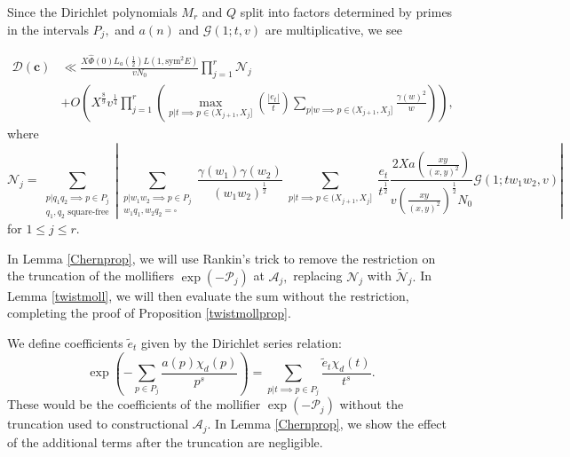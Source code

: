 \documentclass[12pt]{amsart}
\numberwithin{equation}{section}
\numberwithin{thm}{section}
\newcommand{\1}{\mathbf 1}
\begin{document}
Since the Dirichlet polynomials $M_r$ and $Q$ split into factors determined by primes in the intervals $P_j,$ and $a(n)$ and $\mathcal{G}(1;t,v)$ are multiplicative, we see

\begin{align}\label{wellfactorbound}
	\mathscr{D}(\mathbf{c})&\ll\frac{X\hat{\Phi}(0)L_a\left(\frac{1}{2}\right)L(1,\text{sym}^2E)}{vN_0}\prod^{r}_{j=1}\mathscr{N}_j\\\nonumber&+O\left(X^{\frac{8}{9}}v^{\frac{1}{4}}\prod^r_{j=1}\left(\max_{p|t\implies p\in{(X_{j+1},X_j]}}\left( \frac{\left|e_t\right|}{t}\right)\sum_{p|w\implies p\in (X_{j+1},X_{j}]}\frac{\gamma(w)^2}{w}\right)\right),
\end{align}
where \begin{equation}\label{deftilN}
	\mathscr{N}_j=\sum_{\substack{p|q_1q_2\implies p\in P_{j}\\ q_1,q_2\text{ square-free}}}\left|\sum_{\substack{p|w_1w_2\implies p\in P_{j}\\ w_1q_1,w_2q_2=\square}}\frac{\gamma(w_1)\gamma(w_2)}{(w_1w_2)^{\frac{1}{2}}}\sum_{\substack{p|t\implies p\in (X_{j+1},X_{j}]}}			
	\frac{e_{t}}{t^{\frac{1}{2}}} \frac{2Xa\left(\frac{xy}{(x,y)^2}\right)}{v \left(\frac{xy}{(x,y)^2}\right)^{\frac{1}{2}}N_0}\mathcal{G}(1;tw_1w_2,v)
	\right|
\end{equation}
for $1\le j\le r$.



In Lemma \ref{Chernprop}, we will use Rankin's trick to remove the restriction on the truncation of the mollifiers $\exp(-\mathscr{P}_j)$ at $\mathscr{A}_j,$ replacing $\mathscr{N}_j$ with $\tilde{\mathscr{N}}_j.$ In Lemma \ref{twistmoll}, we will then evaluate the sum without the restriction, completing the proof of Proposition \ref{twistmollprop}.

We define coefficients $\tilde{e}_t$ given by the Dirichlet series relation:
\begin{equation}\label{expDirich}
	\exp\left(-\sum_{p\in P_j} \frac{a(p)\chi_d(p)}{p^{s}}\right)=\sum_{p|t\implies p\in P_j} \frac{\tilde{e}_t \chi_d(t)}{t^s}.
\end{equation}
These would be the coefficients of the mollifier $\exp\left(-\mathscr{P}_j\right)$ without the truncation used to constructional $\mathscr{A}_j$. In Lemma \ref{Chernprop}, we show the effect of the additional terms after the truncation are negligible.
\end{document}

